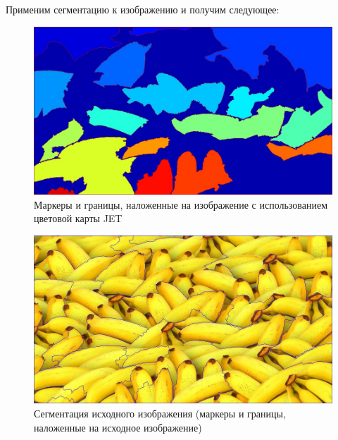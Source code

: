 \documentclass[a4paper, 12pt]{article}
\begin{document}
    Применим сегментацию к изображению и получим следующее:
    \begin{figure}[H]
        \centering
        \includegraphics[scale=0.2]{seg_new_mj.jpg}
        \captionsetup{skip=0pt}
        \caption{Маркеры и границы, наложенные на изображение
        с использованием цветовой карты JET}
        \label{fig:segnj}
    \end{figure}
    \begin{figure}[H]
        \centering
        \includegraphics[scale=0.2]{seg_new.jpg}
        \captionsetup{skip=0pt}
        \caption{Сегментация исходного изображения (маркеры и границы, наложенные на исходное изображение)}
        \label{fig:segn}
    \end{figure}
\end{document}
